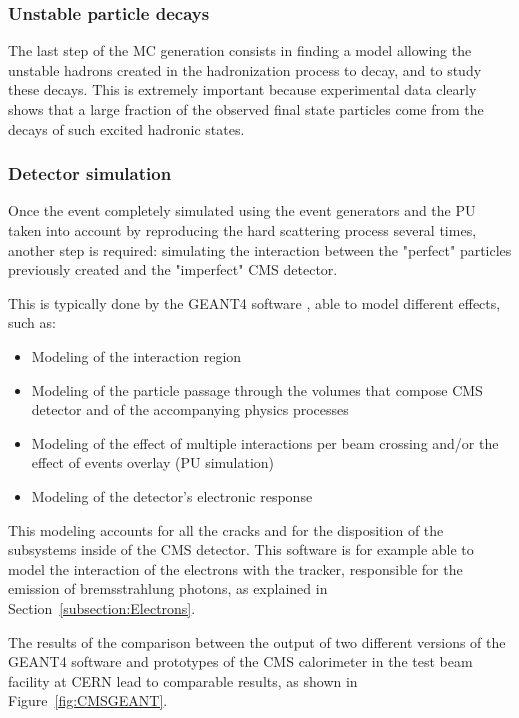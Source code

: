 \documentclass[a4paper, 10pt, openright]{report}
\begin{document}
\subsubsection*{Unstable particle decays}

The last step of the \ac{MC} generation consists in finding a model allowing the unstable hadrons created in the hadronization process to decay, and to study these decays. This is extremely important because experimental data clearly shows that a large fraction of the observed final state particles come from the decays of such excited hadronic states.

\subsubsection*{Detector simulation}

Once the event completely simulated using the event generators and the \ac{PU} taken into account by reproducing the hard scattering process several times, another step is required: simulating the interaction between the "perfect" particles previously created and the "imperfect" \ac{CMS} detector. 

This is typically done by the GEANT4 software \cite{Geant4}, able to model different effects, such as:

\begin{itemize}
\item Modeling of the interaction region
\item Modeling of the particle passage through the volumes that compose CMS detector and of the accompanying physics processes
\item Modeling of the effect of multiple interactions per beam crossing and/or the effect of events overlay (\ac{PU} simulation)
\item Modeling of the detector's electronic response
\end{itemize}

This modeling accounts for all the cracks and for the disposition of the subsystems inside of the \ac{CMS} detector. This software is for example able to model the interaction of the electrons with the tracker, responsible for the emission of bremsstrahlung photons, as explained in Section~\ref{subsection:Electrons}.

The results of the comparison between the output of two different versions of the GEANT4 software and prototypes of the CMS calorimeter in the test beam facility at \ac{CERN} lead to comparable results, as shown in Figure~\ref{fig:CMSGEANT}.
\end{document}
